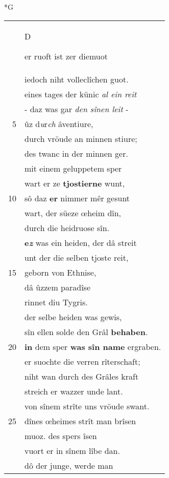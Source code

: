 \documentclass[8pt,a4paper,notitlepage]{article}
\begin{document}
\begin{table}[ht]
\begin{minipage}[t]{0.5\linewidth}
\small
\begin{center}*G
\end{center}
\begin{tabular}{rl}
 & \begin{large}D\end{large}er ruoft ist zer diemuot\\ 
 & iedoch niht volleclîchen guot.\\ 
 & eines tages der künic \textit{al ein reit}\\ 
 & - daz was gar \textit{den sînen leit} -\\ 
5 & ûz d\textit{u}r\textit{ch} âventiure,\\ 
 & durch vröude an minnen stiure;\\ 
 & des twanc in der minnen ger.\\ 
 & mit einem geluppetem sper\\ 
 & wart er ze \textbf{tjostierne} wunt,\\ 
10 & sô daz \textbf{er} nimmer mêr gesunt\\ 
 & wart, der süeze œheim dîn,\\ 
 & durch die heidruose sîn.\\ 
 & \textbf{e\textit{z}} was ein heiden, der dâ streit\\ 
 & unt der die selben tjoste reit,\\ 
15 & geborn von Ethnise,\\ 
 & dâ ûzzem paradîse\\ 
 & rinnet diu Tygris.\\ 
 & der selbe heiden was gewis,\\ 
 & sîn ellen solde den Grâl \textbf{behaben}.\\ 
20 & \textbf{in} dem sper \textbf{was sîn name} ergraben.\\ 
 & er suochte die verren rîterschaft;\\ 
 & niht wan durch des Grâles kraft\\ 
 & streich er wazzer unde lant.\\ 
 & von sînem strîte uns vröude swant.\\ 
25 & dînes œheimes strît man brîsen\\ 
 & muoz. des spers îsen\\ 
 & vuort er in sînem lîbe dan.\\ 
 & dô der junge, werde man\\ 

\end{tabular}
\end{minipage}
\end{table}
\end{document}
